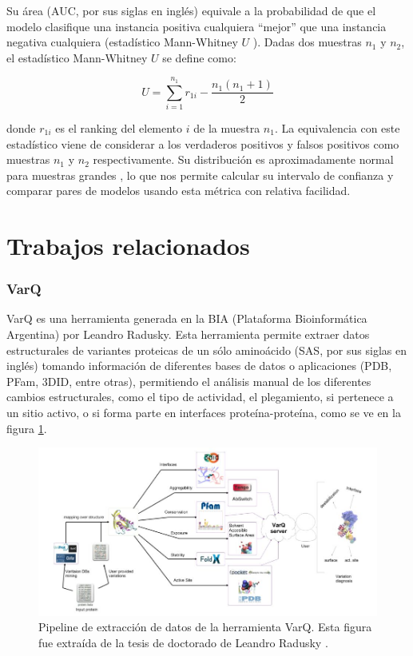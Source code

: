 \begin{itemize}
    Su área (AUC, por sus siglas en inglés) equivale a la probabilidad de que el modelo clasifique una instancia positiva cualquiera ``mejor'' que una instancia negativa cualquiera (estadístico Mann-Whitney $U$ \cite{doi:10.1256/003590002320603584}). Dadas dos muestras $n_1$ y $n_2$, el estadístico Mann-Whitney $U$ se define como:
    
    \begin{equation*}
        U = \sum_{i = 1}^{n_1} r_{1i} - \frac{n_1 (n_1 + 1)}{2}
    \end{equation*}
    
    donde $r_{1i}$ es el ranking del elemento $i$ de la muestra $n_1$. La equivalencia con este estadístico viene de considerar a los verdaderos positivos y falsos positivos como muestras $n_1$ y $n_2$ respectivamente. Su distribución es aproximadamente normal para muestras grandes \cite{mann1947}, lo que nos permite calcular su intervalo de confianza y comparar pares de modelos usando esta métrica con relativa facilidad.
    

\end{itemize}



\section{Trabajos relacionados}

\subsubsection{VarQ}

VarQ es una herramienta generada en la BIA (Plataforma Bioinformática Argentina) por Leandro Radusky. Esta herramienta permite extraer datos estructurales de variantes proteicas de un sólo aminoácido (SAS, por sus siglas en inglés) tomando información de diferentes bases de datos o aplicaciones (PDB, PFam, 3DID, entre otras), permitiendo el análisis manual de los diferentes cambios estructurales, como el tipo de actividad, el plegamiento, si pertenece a un sitio activo, o si forma parte en interfaces proteína-proteína, como se ve en la figura \ref{fig:varq_pipeline}. 

\begin{figure}[H]
    \centering
    \includegraphics[scale=0.45]{documents/latex/figures/1/pipeline.png}
    \caption{Pipeline de extracción de datos de la herramienta VarQ. Esta figura fue extraída de la tesis de doctorado de Leandro Radusky \cite{Radusky2017}.}
    \label{fig:varq_pipeline}
\end{figure}

